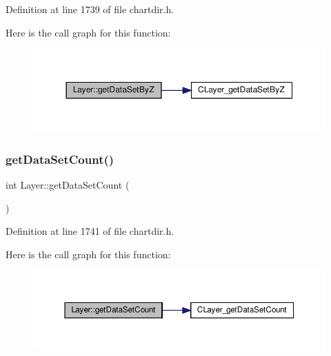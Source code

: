 Definition at line 1739 of file chartdir.\+h.

Here is the call graph for this function\+:
\nopagebreak
\begin{figure}[H]
\begin{center}
\leavevmode
\includegraphics[width=350pt]{class_layer_a27a86fcb9a2e6d782ccd8a9c5ea1bed7_cgraph}
\end{center}
\end{figure}
\mbox{\label{class_layer_affe94b8f21f405ff17f9d83f86211db5}} 
\subsubsection{\texorpdfstring{get\+Data\+Set\+Count()}{getDataSetCount()}}
{\footnotesize\ttfamily int Layer\+::get\+Data\+Set\+Count (\begin{DoxyParamCaption}{ }\end{DoxyParamCaption})\hspace{0.3cm}{\ttfamily [inline]}}



Definition at line 1741 of file chartdir.\+h.

Here is the call graph for this function\+:
\nopagebreak
\begin{figure}[H]
\begin{center}
\leavevmode
\includegraphics[width=350pt]{class_layer_affe94b8f21f405ff17f9d83f86211db5_cgraph}
\end{center}
\end{figure}
\mbox{\label{class_layer_ad4e641a703136de5642873341a52be7d}} 
